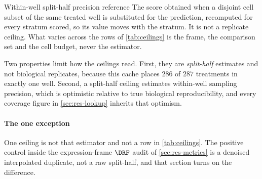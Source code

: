 \begin{defn}{Within-well split-half precision reference}
The score obtained when a disjoint cell subset of the same treated well is
substituted for the prediction, recomputed for every stratum scored, so its
value moves with the stratum. It is not a replicate ceiling. What varies across
the rows of \cref{tab:ceilings} is the frame, the comparison set and the cell
budget, never the estimator.
\end{defn}

Two properties limit how the ceilings read. First, they are \emph{split-half}
estimates and not biological replicates, because this cache places $286$ of
$287$ treatments in exactly one well. Second, a split-half ceiling estimates
within-well sampling precision, which is optimistic relative to true biological
reproducibility, and every coverage figure in \cref{sec:res-lookup} inherits
that optimism.

\paragraph{The one exception} One ceiling is not that estimator and not a row in
\cref{tab:ceilings}. The positive control inside the expression-frame $\DRF$
audit of \cref{sec:res-metrics} is a denoised interpolated duplicate, not a raw
split-half, and that section turns on the difference.

